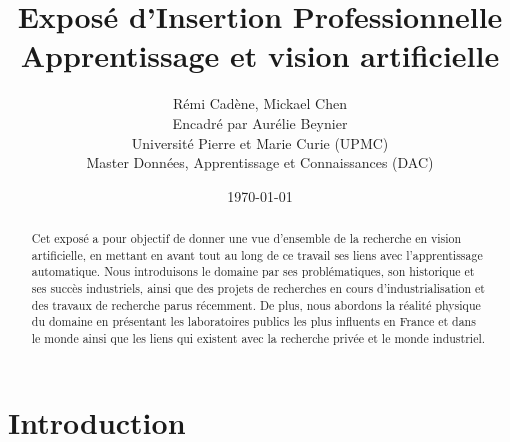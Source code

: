 \documentclass{article}
\begin{document}
\title{Exposé d'Insertion Professionnelle \\ Apprentissage et vision artificielle}

\author{Rémi Cadène, Mickael Chen \\ 
Encadré par Aurélie Beynier \\
Université Pierre et Marie Curie (UPMC) \\
Master Données, Apprentissage et Connaissances (DAC)}


\date{\today}

\maketitle

\newpage
\tableofcontents

\newpage

\begin{abstract}
Cet exposé a pour objectif de donner une vue d'ensemble de la recherche en vision artificielle, en mettant en avant tout au long de ce travail ses liens avec l'apprentissage automatique.
Nous introduisons le domaine par ses problématiques, son historique et ses succès industriels, ainsi que des projets de recherches en cours d'industrialisation et des travaux de recherche parus récemment. De plus, nous abordons la réalité physique du domaine en présentant les laboratoires publics les plus influents en France et dans le monde ainsi que les liens qui existent avec la recherche privée et le monde industriel.
\end{abstract}

\section{Introduction}
\end{document}
